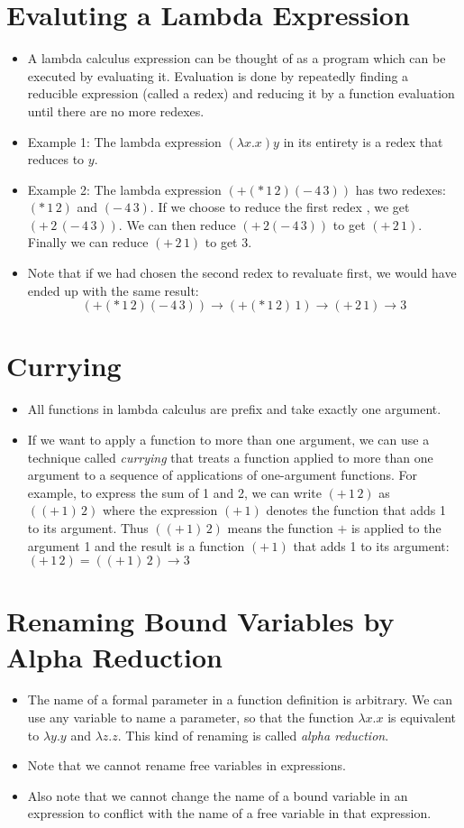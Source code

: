 \documentclass[]{article}
\begin{document}
\section{Evaluting a Lambda Expression}
\begin{itemize}
\item A lambda calculus expression can be thought of as a program which can be executed by evaluating it. Evaluation is done by repeatedly finding a reducible expression (called a redex) and reducing it by a function evaluation until there are no more redexes.
\item Example 1: The lambda expression $(\lambda x.x)y$ in its entirety is a redex that reduces to $y$.
\item Example 2: The lambda expression $(+(*\,1\,2)(-\,4\,3))$ has two redexes: $(*\,1\,2)$ and $(-\,4\,3)$. If we choose to reduce the first redex , we get $(+\,2\,(-\,4\,3))$. We can then reduce $(+\,2(-\,4\,3))$ to get $(+\,2\,1)$. Finally we can reduce $(+\,2\,1)$ to get 3.
\item Note that if we had chosen the second redex to revaluate first, we would have ended up with the same result:
\[ (+(*\,1\,2)(-\,4\,3))\rightarrow(+(*\,1\,2)\,1)\rightarrow(+\,2\,1)\rightarrow 3 \]
\end{itemize}

\section{Currying}
\begin{itemize}
\item All functions in lambda calculus are prefix and take exactly one argument.
\item If we want to apply a function to more than one argument, we can use a technique called \emph{currying} that treats a function applied to more than one argument to a sequence of applications of one-argument functions. For example, to express the sum of 1 and 2, we can write $(+\,1\,2)$ as $((+\,1)\,2)$ where the expression $(+\,1)$ denotes the function that adds 1 to its argument. Thus $((+\,1)\,2)$ means the function $+$ is applied to the argument 1 and the result is a function $(+\,1)$ that adds 1 to its argument: $(+\,1\,2)=((+\,1)\,2)\rightarrow 3$
\end{itemize}

\section{Renaming Bound Variables by Alpha Reduction}
\begin{itemize}
\item The name of a formal parameter in a function definition is arbitrary. We can use any variable to name a parameter, so that the function $\lambda x.x$ is equivalent to $\lambda y.y$ and $\lambda z.z$. This kind of renaming is called \emph{alpha reduction}.
\item Note that we cannot rename free variables in expressions.
\item Also note that we cannot change the name of a bound variable in an expression to conflict with the name of a free variable in that expression.
\end{itemize}
\end{document}
